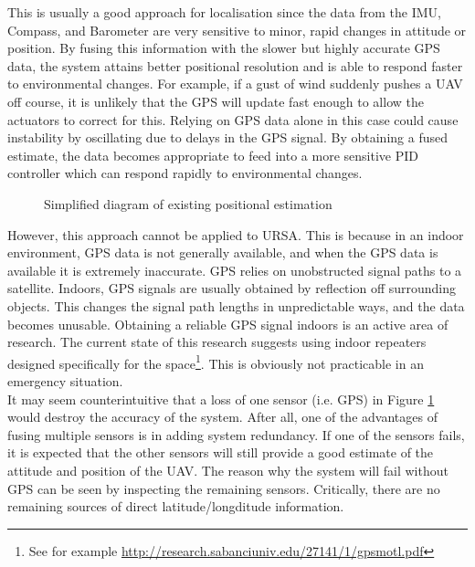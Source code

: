 \documentclass[capstone_report.tex]{subfiles}
\begin{document}
    This is usually a good approach for localisation since the data from the IMU, Compass, and Barometer are very sensitive to minor, rapid changes in attitude or position. By fusing this information with the slower but highly accurate GPS data, the system attains better positional resolution and is able to respond faster to environmental changes. For example, if a gust of wind suddenly pushes a UAV off course, it is unlikely that the GPS will update fast enough to allow the actuators to correct for this. Relying on GPS data alone in this case could cause instability by oscillating due to delays in the GPS signal. By obtaining a fused estimate, the data becomes appropriate to feed into a more sensitive PID controller which can respond rapidly to environmental changes.

    \begin{figure}[H]
    	
    	\caption{Simplified diagram of existing positional estimation\label{fig:estAlg2}}
    \end{figure}

    However, this approach cannot be applied to URSA. This is because in an indoor environment, GPS data is not generally available, and when the GPS data is available it is extremely inaccurate. GPS relies on unobstructed signal paths to a satellite. Indoors, GPS signals are usually obtained by reflection off surrounding objects. This changes the signal path lengths in unpredictable ways, and the data becomes unusable. Obtaining a reliable GPS signal indoors is an active area of research. The current state of this research suggests using indoor repeaters designed specifically for the space\footnote{See for example \url{http://research.sabanciuniv.edu/27141/1/gpsmotl.pdf}}. This is obviously not practicable in an emergency situation. \\

    It may seem counterintuitive that a loss of one sensor (i.e. GPS) in Figure \ref{fig:estAlg2} would destroy the accuracy of the system. After all, one of the advantages of fusing multiple sensors is in adding system redundancy. If one of the sensors fails, it is expected that the other sensors will still provide a good estimate of the attitude and position of the UAV. The reason why the system will fail without GPS can be seen by inspecting the remaining sensors. Critically, there are no remaining sources of direct latitude/longditude information. \\
\end{document}
